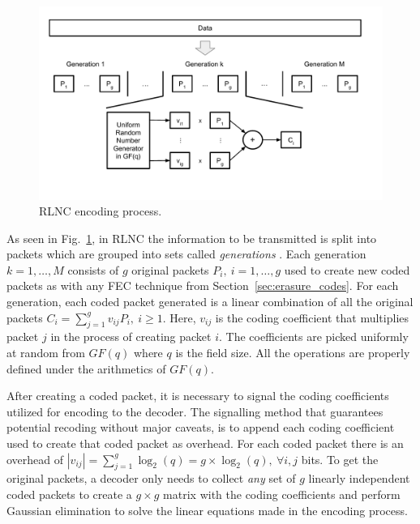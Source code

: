 \begin{figure}[h]
  \centering
  \includegraphics[width=\textwidth]{introduction/figures/RLNC.pdf}
  \caption{RLNC encoding process.}
\label{fig:rlnc_enc}
\end{figure}

As seen in Fig.~\ref{fig:rlnc_enc}, in \ac{RLNC} the information to be transmitted is split into packets which are grouped into sets called \textit{generations} \cite{chou2003practical}. Each generation $k = 1, \ldots, M$ consists of $g$ original packets $P_i,\ i = 1, \ldots, g$ used to create new coded packets as with any \ac{FEC} technique from Section~\ref{sec:erasure_codes}. For each generation, each coded packet generated is a linear combination of all the original packets $C_i = \sum_{j = 1}^g v_{ij} P_i,\ i \geq 1$. Here, $v_{ij}$ is the coding coefficient that multiplies packet $j$ in the process of creating packet $i$. The coefficients are picked uniformly at random from $GF(q)$ where $q$ is the field size. All the operations are properly defined under the arithmetics of $GF(q)$.

After creating a coded packet, it is necessary to signal the coding coefficients utilized for encoding to the decoder. The signalling method that guarantees potential recoding without major caveats, is to append each coding coefficient used to create that coded packet as overhead. For each coded packet there is an overhead of $|v_{ij}| = \sum_{j = 1}^g \log_{2}(q) = g \times \log_{2}(q),\ \forall i,j$ bits. To get the original packets, a decoder only needs to collect \textit{any} set of $g$ linearly independent coded packets to create a $g \times g$ matrix with the coding coefficients and perform Gaussian elimination \cite{fragouli2006network} to solve the linear equations made in the encoding process.

